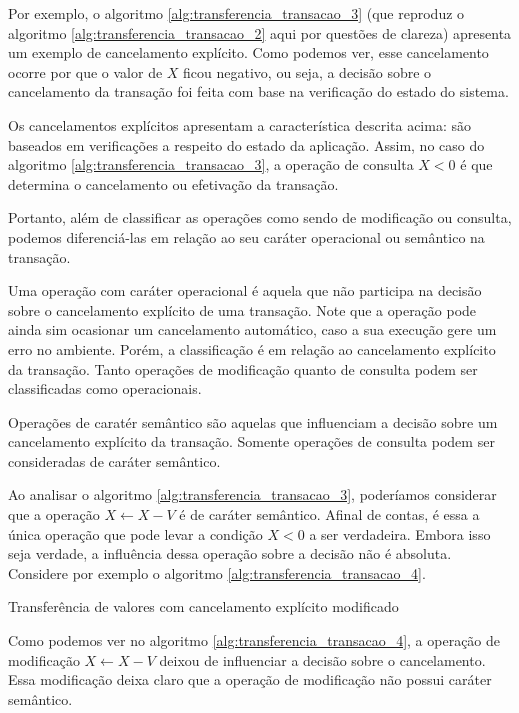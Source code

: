 \documentclass[11pt,twoside,a4paper]{book}
\begin{document}
Por exemplo, o algoritmo \ref{alg:transferencia_transacao_3} (que reproduz o algoritmo \ref{alg:transferencia_transacao_2} aqui por questões de clareza) apresenta um exemplo de cancelamento explícito. Como podemos ver, esse cancelamento ocorre por que o valor de $X$ ficou negativo, ou seja, a decisão sobre o cancelamento da transação foi feita com base na verificação do estado do sistema.

Os cancelamentos explícitos apresentam a característica descrita acima: são baseados em verificações a respeito do estado da aplicação. Assim, no caso do algoritmo \ref{alg:transferencia_transacao_3}, a operação de consulta $X < 0$ é que determina o cancelamento ou efetivação da transação.

Portanto, além de classificar as operações como sendo de modificação ou consulta, podemos diferenciá-las em relação ao seu caráter operacional ou semântico na transação.

Uma operação com caráter operacional é aquela que não participa na decisão sobre o cancelamento explícito de uma transação. Note que a operação pode ainda sim ocasionar um cancelamento automático, caso a sua execução gere um erro no ambiente. Porém, a classificação é em relação ao cancelamento explícito da transação. Tanto operações de modificação quanto de consulta podem ser classificadas como operacionais.

Operações de caratér semântico são aquelas que influenciam a decisão sobre um cancelamento explícito da transação. Somente operações de consulta podem ser consideradas de caráter semântico.

Ao analisar o algoritmo \ref{alg:transferencia_transacao_3}, poderíamos considerar que a operação $X \gets X - V$ é de caráter semântico. Afinal de contas, é essa a única operação que pode levar a condição $X < 0$ a ser verdadeira. Embora isso seja verdade, a influência dessa operação sobre a decisão não é absoluta. Considere por exemplo o algoritmo \ref{alg:transferencia_transacao_4}.

\begin{algorithm}
\caption{Transferência de valores com cancelamento explícito modificado}
\label{alg:transferencia_transacao_4}
\end{algorithm}

Como podemos ver no algoritmo \ref{alg:transferencia_transacao_4}, a operação de modificação $X \gets X - V$ deixou de influenciar a decisão sobre o cancelamento. Essa modificação deixa claro que a operação de modificação não possui caráter semântico.
\end{document}
